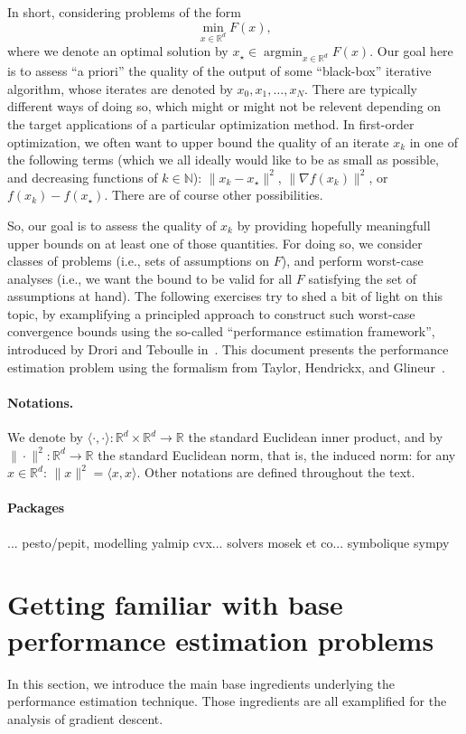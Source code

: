 \documentclass[11pt,a4paper]{article}
\newcommand{\inner}[2]{{\langle #1, #2\rangle}}
\DeclareMathOperator*{\argmin}{argmin}
\begin{document}
	In short, considering problems of the form \[\min_{x\in\mathbb{R}^d} F(x),\] where we denote an optimal solution by $x_\star\in\argmin_{x\in\mathbb{R}^d} F(x)$. Our goal here is to assess ``a priori'' the quality of the output of some ``black-box'' iterative algorithm, whose iterates are denoted by $x_0,x_1,\ldots,x_N$. There are typically different ways of doing so, which might or might not be relevent depending on the target applications of a particular optimization method. In first-order optimization, we often want to upper bound the quality of an iterate $x_k$ in one of the following terms (which we all ideally would like to be as small as possible, and decreasing functions of $k\in\mathbb{N}$): $\|x_k-x_\star\|^2$, $\|\nabla f(x_k)\|^2$, or $f(x_k)-f(x_\star)$. There are of course other possibilities.

So, our goal is to assess the quality of $x_k$ by providing hopefully meaningfull upper bounds on at least one of those quantities. For doing so, we consider classes of problems (i.e., sets of assumptions on $F$), and perform worst-case analyses (i.e., we want the bound to be valid for all $F$ satisfying the set of assumptions at hand). The following exercises try to shed a bit of light on this topic, by examplifying a principled approach to construct such worst-case convergence bounds using the so-called ``performance estimation framework'', introduced by Drori and Teboulle in~\cite{drori2014performance}. This document presents the performance estimation problem using the formalism from Taylor, Hendrickx, and Glineur~\cite{taylor2015exact,taylor2015smooth}.

\paragraph{Notations.} We denote by $\inner{\cdot}{\cdot}:\mathbb{R}^d\times \mathbb{R}^d\rightarrow\mathbb{R} $ the standard Euclidean inner product, and by $\|\cdot \|^2:\mathbb{R}^d\rightarrow\mathbb{R}$ the standard Euclidean norm, that is, the induced norm: for any $x\in\mathbb{R}^d$: $\|x\|^2=\inner{x}{x}$. Other notations are defined throughout the text.

\paragraph{Packages}... pesto/pepit, modelling yalmip cvx... solvers mosek et co... symbolique sympy
	\section{Getting familiar with base performance estimation problems}	\label{s:pep_basis}	%
	In this section, we introduce the main base ingredients underlying the performance estimation technique. Those ingredients are all examplified for the analysis of gradient descent.
	
\end{document}
